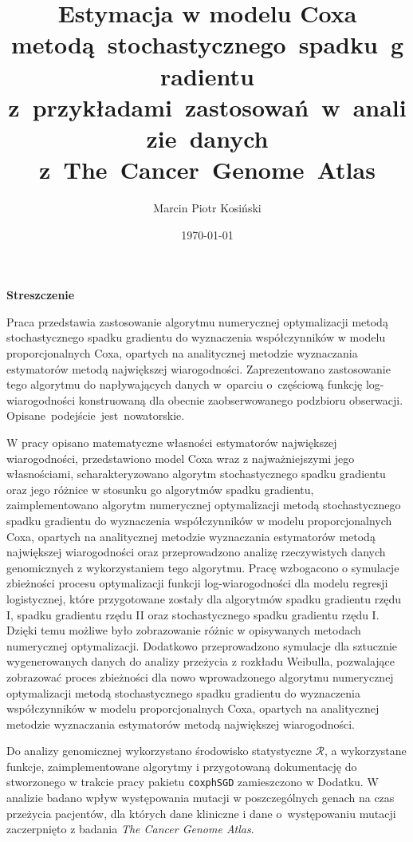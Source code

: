 \documentclass[]{mini}
\title{Estymacja w modelu Coxa metodą~stochastycznego~spadku~gradientu z~przykładami~zastosowań~w~analizie~danych z~The~Cancer~Genome~Atlas}
\author{Marcin Piotr Kosiński}
\date{\today}
\begin{document}
%
%


\maketitle

\begin{center}
\textbf{Streszczenie}
\end{center}

Praca przedstawia zastosowanie algorytmu numerycznej optymalizacji metodą stochastycznego spadku gradientu do wyznaczenia współczynników w modelu proporcjonalnych Coxa, opartych na analitycznej metodzie wyznaczania estymatorów metodą największej wiarogodności. Zaprezentowano zastosowanie tego algorytmu do napływających danych w~oparciu o~częściową funkcję log-wiarogodności konstruowaną dla obecnie zaobserwowanego podzbioru obserwacji. Opisane~podejście~jest~nowatorskie. 

W pracy opisano matematyczne własności estymatorów największej wiarogodności, przedstawiono model Coxa wraz z najważniejszymi jego własnościami, scharakteryzowano algorytm stochastycznego spadku gradientu oraz jego różnice w stosunku go algorytmów spadku gradientu, zaimplementowano algorytm numerycznej optymalizacji metodą stochastycznego spadku gradientu do wyznaczenia współczynników w modelu proporcjonalnych Coxa, opartych na analitycznej metodzie wyznaczania estymatorów metodą największej wiarogodności oraz przeprowadzono analizę rzeczywistych danych genomicznych z wykorzystaniem tego algorytmu. Pracę wzbogacono o symulacje zbieżności procesu optymalizacji funkcji log-wiarogodności dla modelu regresji logistycznej, które przygotowane zostały dla algorytmów spadku gradientu rzędu I, spadku gradientu rzędu II oraz stochastycznego spadku gradientu rzędu I. Dzięki temu możliwe było zobrazowanie różnic w opisywanych metodach numerycznej optymalizacji. Dodatkowo przeprowadzono symulacje dla sztucznie wygenerowanych danych do analizy przeżycia z rozkładu Weibulla, pozwalające zobrazować proces zbieżności dla nowo wprowadzonego algorytmu numerycznej optymalizacji metodą stochastycznego spadku gradientu do wyznaczenia współczynników w modelu proporcjonalnych Coxa, opartych na analitycznej metodzie wyznaczania estymatorów metodą największej wiarogodności.

Do analizy genomicznej wykorzystano środowisko statystyczne $\mathcal{R}$, a wykorzystane funkcje, zaimplementowane algorytmy i przygotowaną dokumentację do stworzonego w trakcie pracy pakietu \texttt{coxphSGD} zamieszczono w Dodatku. W analizie badano wpływ występowania mutacji w poszczególnych genach na czas przeżycia pacjentów, dla których dane kliniczne i dane o~występowaniu mutacji zaczerpnięto z badania \textit{The Cancer Genome Atlas}. \ \\
\end{document}

